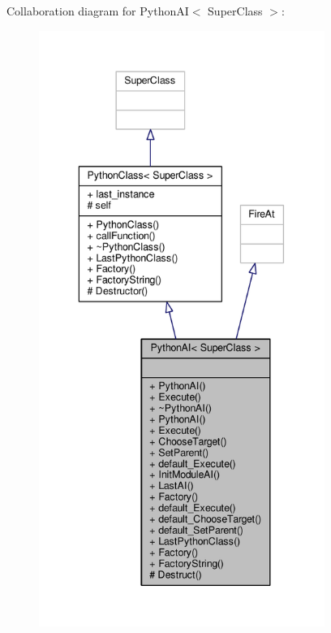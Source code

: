 Collaboration diagram for Python\+AI$<$ Super\+Class $>$\+:
\nopagebreak
\begin{figure}[H]
\begin{center}
\leavevmode
\includegraphics[height=550pt]{dc/d2a/classPythonAI__coll__graph}
\end{center}
\end{figure}
